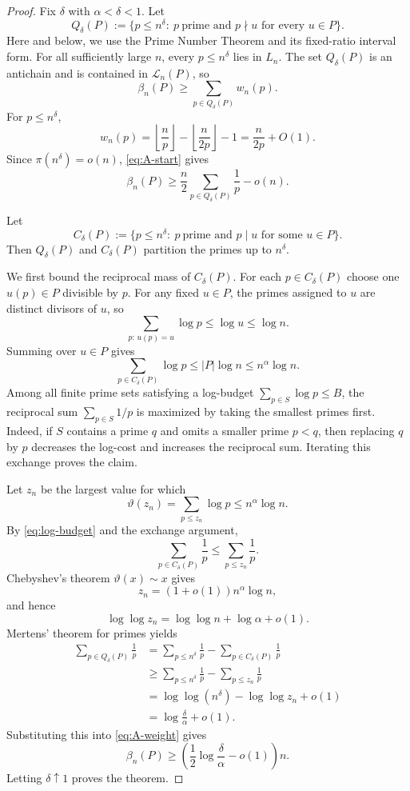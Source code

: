 \begin{proof}
Fix $\delta$ with $\alpha<\delta<1$.  Let
\[
  Q_\delta(P):=
  \{p\le n^\delta:\ p\ \text{prime and }p\nmid u\text{ for every }u\in P\}.
\]
Here and below, we use the Prime Number Theorem
\cite[Theorem~6]{HardyWright08} and its fixed-ratio interval form.
For all sufficiently large $n$, every $p\le n^\delta$ lies in $L_n$.  The set
$Q_\delta(P)$ is an antichain and is contained in $\mathcal L_n(P)$, so
\[
  \beta_n(P)\ge \sum_{p\in Q_\delta(P)}w_n(p).
  \tag{4.1}\label{eq:A-start}
\]
For $p\le n^\delta$,
\[
  w_n(p)
  =
  \left\lfloor\frac np\right\rfloor
  -
  \left\lfloor\frac{n}{2p}\right\rfloor
  -1
  =
  \frac{n}{2p}+O(1).
\]
Since $\pi(n^\delta)=o(n)$, \eqref{eq:A-start} gives
\[
  \beta_n(P)
  \ge
  \frac n2\sum_{p\in Q_\delta(P)}\frac1p-o(n).
  \tag{4.2}\label{eq:A-weight}
\]

Let
\[
  C_\delta(P):=\{p\le n^\delta:\ p\ \text{prime and }p\mid u
  \text{ for some }u\in P\}.
\]
Then $Q_\delta(P)$ and $C_\delta(P)$ partition the primes up to $n^\delta$.

We first bound the reciprocal mass of $C_\delta(P)$.  For each
$p\in C_\delta(P)$ choose one $u(p)\in P$ divisible by $p$.  For any fixed
$u\in P$, the primes assigned to $u$ are distinct divisors of $u$, so
\[
  \sum_{p:\,u(p)=u}\log p\le \log u\le \log n.
\]
Summing over $u\in P$ gives
\[
  \sum_{p\in C_\delta(P)}\log p\le |P|\log n\le n^\alpha\log n.
  \tag{4.3}\label{eq:log-budget}
\]
Among all finite prime sets satisfying a log-budget
$\sum_{p\in S}\log p\le B$, the reciprocal sum $\sum_{p\in S}1/p$ is maximized
by taking the smallest primes first.  Indeed, if $S$ contains a prime $q$ and
omits a smaller prime $p<q$, then replacing $q$ by $p$ decreases the log-cost
and increases the reciprocal sum.  Iterating this exchange proves the claim.

Let $z_n$ be the largest value for which
\[
  \vartheta(z_n)=\sum_{p\le z_n}\log p\le n^\alpha\log n.
\]
By \eqref{eq:log-budget} and the exchange argument,
\[
  \sum_{p\in C_\delta(P)}\frac1p
  \le
  \sum_{p\le z_n}\frac1p.
  \tag{4.4}\label{eq:covered-mertens-bound}
\]
Chebyshev's theorem $\vartheta(x)\sim x$
\cite[Theorem~7]{HardyWright08} gives
\[
  z_n=(1+o(1))n^\alpha\log n,
\]
and hence
\[
  \log\log z_n=\log\log n+\log\alpha+o(1).
\]
Mertens' theorem for primes \cite{HardyWright08} yields
\[
\begin{aligned}
  \sum_{p\in Q_\delta(P)}\frac1p
  &=
  \sum_{p\le n^\delta}\frac1p
  -
  \sum_{p\in C_\delta(P)}\frac1p\\
  &\ge
  \sum_{p\le n^\delta}\frac1p
  -
  \sum_{p\le z_n}\frac1p\\
  &=
  \log\log(n^\delta)-\log\log z_n+o(1)\\
  &=
  \log\frac{\delta}{\alpha}+o(1).
\end{aligned}
\]
Substituting this into \eqref{eq:A-weight} gives
\[
  \beta_n(P)\ge
  \left(\frac12\log\frac{\delta}{\alpha}-o(1)\right)n.
\]
Letting $\delta\uparrow1$ proves the theorem.
\end{proof}

